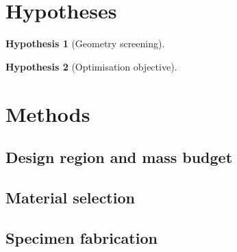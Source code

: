 \documentclass[11pt,a4paper]{article}
\theoremstyle{claim}
\newtheorem{hypothesis}{Hypothesis}
\begin{document}
\section{Hypotheses}

\begin{hypothesis}[Geometry screening]
\end{hypothesis}

\begin{hypothesis}[Optimisation objective]
\end{hypothesis}

\section{Methods}

\subsection{Design region and mass budget}

\subsection{Material selection}

\subsection{Specimen fabrication}
\end{document}
